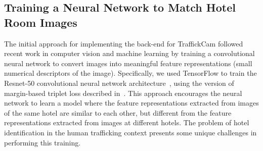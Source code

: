 \documentclass[12pt]{article}
\begin{document}
\subsection{Training a Neural Network to Match Hotel Room Images}
\label{sec:training}

The initial approach for implementing the back-end for TraffickCam followed recent work in computer vision and machine learning by training a convolutional neural network to convert images into meaningful feature representations (small numerical descriptors of the image). Specifically, we used TensorFlow to train the Resnet-50 convolutional neural network architecture~\cite{resnet}, using the version of margin-based triplet loss described in~\cite{HermansBeyer2017Arxiv}. This approach encourages the neural network to learn a model where the feature representations extracted from images of the same hotel are similar to each other, but different from the feature representations extracted from images at different hotels. The problem of hotel identification in the human trafficking context presents some unique challenges in performing this training.
\end{document}
